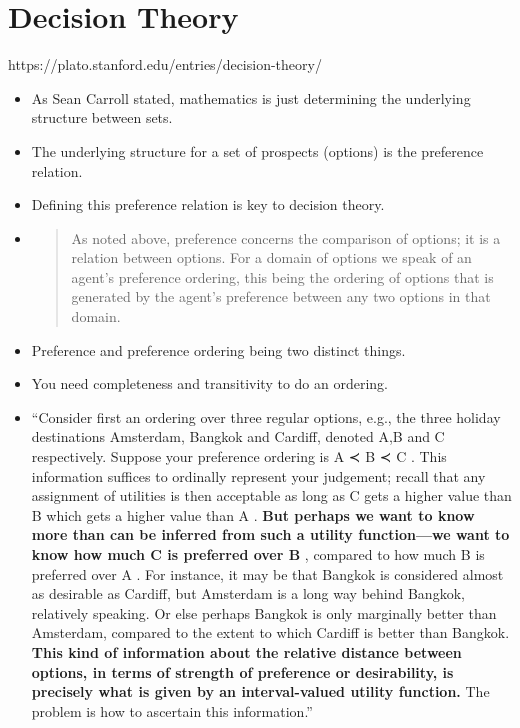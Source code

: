 \documentclass[11pt]{article}
\begin{document}
\hypertarget{decision-theory}{%
\section{Decision Theory}\label{decision-theory}}

https://plato.stanford.edu/entries/decision-theory/

\begin{itemize}
\item
  As Sean Carroll stated, mathematics is just determining the underlying
  structure between sets.
\item
  The underlying structure for a set of prospects (options) is the
  preference relation.
\item
  Defining this preference relation is key to decision theory.
\item
  \begin{quote}
  As noted above, preference concerns the comparison of options; it is a
  relation between options. For a domain of options we speak of an
  agent's preference ordering, this being the ordering of options that
  is generated by the agent's preference between any two options in that
  domain.
  \end{quote}
\item
  Preference and preference ordering being two distinct things.
\item
  You need completeness and transitivity to do an ordering.
\item
  ``Consider first an ordering over three regular options, e.g., the
  three holiday destinations Amsterdam, Bangkok and Cardiff, denoted A,B
  and C respectively. Suppose your preference ordering is A ≺ B ≺ C .
  This information suffices to ordinally represent your judgement;
  recall that any assignment of utilities is then acceptable as long as
  C gets a higher value than B which gets a higher value than A .
  \textbf{But perhaps we want to know more than can be inferred from
  such a utility function---we want to know how much C is preferred over
  B} , compared to how much B is preferred over A . For instance, it may
  be that Bangkok is considered almost as desirable as Cardiff, but
  Amsterdam is a long way behind Bangkok, relatively speaking. Or else
  perhaps Bangkok is only marginally better than Amsterdam, compared to
  the extent to which Cardiff is better than Bangkok. \textbf{This kind
  of information about the relative distance between options, in terms
  of strength of preference or desirability, is precisely what is given
  by an interval-valued utility function.} The problem is how to
  ascertain this information.''
\end{itemize}
\end{document}
